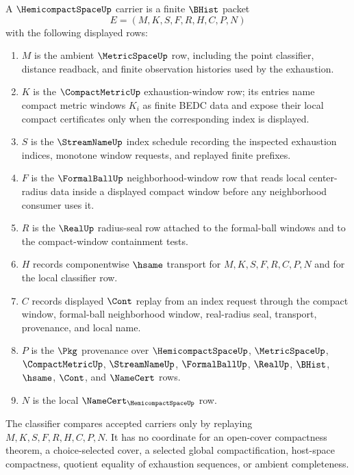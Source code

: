 \begin{definition}
\label{def:hemicompact-space-carrier}
A $\HemicompactSpaceUp$ carrier is a finite $\BHist$ packet
$$
E=(M,K,S,F,R,H,C,P,N)
$$
with the following displayed rows:
\begin{enumerate}
\item $M$ is the ambient $\MetricSpaceUp$ row, including the point classifier, distance readback, and finite observation histories used by the exhaustion.
\item $K$ is the $\CompactMetricUp$ exhaustion-window row; its entries name compact metric windows $K_i$ as finite BEDC data and expose their local compact certificates only when the corresponding index is displayed.
\item $S$ is the $\StreamNameUp$ index schedule recording the inspected exhaustion indices, monotone window requests, and replayed finite prefixes.
\item $F$ is the $\FormalBallUp$ neighborhood-window row that reads local center-radius data inside a displayed compact window before any neighborhood consumer uses it.
\item $R$ is the $\RealUp$ radius-seal row attached to the formal-ball windows and to the compact-window containment tests.
\item $H$ records componentwise $\hsame$ transport for $M,K,S,F,R,C,P,N$ and for the local classifier row.
\item $C$ records displayed $\Cont$ replay from an index request through the compact window, formal-ball neighborhood window, real-radius seal, transport, provenance, and local name.
\item $P$ is the $\Pkg$ provenance over $\HemicompactSpaceUp$, $\MetricSpaceUp$, $\CompactMetricUp$, $\StreamNameUp$, $\FormalBallUp$, $\RealUp$, $\BHist$, $\hsame$, $\Cont$, and $\NameCert$ rows.
\item $N$ is the local $\NameCert_{\HemicompactSpaceUp}$ row.
\end{enumerate}
The classifier compares accepted carriers only by replaying $M,K,S,F,R,H,C,P,N$. It has no coordinate for an open-cover compactness theorem, a choice-selected cover, a selected global compactification, host-space compactness, quotient equality of exhaustion sequences, or ambient completeness.
\end{definition}

